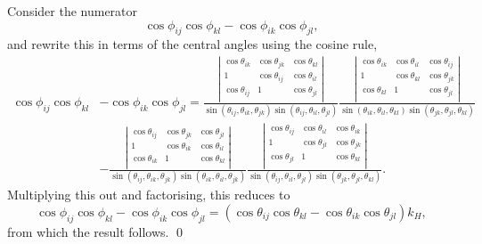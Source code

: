 \documentclass[fleqn,11pt,twoside]{article}
\makeatletter
\renewenvironment{proof}[1][\proofname]{\par
  \normalfont
  \topsep6\p@\@plus6\p@ \trivlist
  \item[\hskip\labelsep\textbf{%
    #1\@addpunct{.}}]\ignorespaces
}{%
  \qed\endtrivlist
}
\theoremstyle{definition}
\makeatother
\begin{document}
\begin{proof}
Consider the numerator
\begin{equation}
\cos\phi_{ij}\cos\phi_{kl}-\cos\phi_{ik}\cos\phi_{jl},
\end{equation}
and rewrite this in terms of the central angles using the cosine rule,
\begin{equation}
\begin{split}
\cos\phi_{ij}\cos\phi_{kl}&-\cos\phi_{ik}\cos\phi_{jl}=
\frac{\left|\begin{array}{ccc}
\cos\theta_{ik} & \cos\theta_{jk} & \cos\theta_{kl}\\
1 & \cos\theta_{ij} & \cos\theta_{il}\\
\cos\theta_{ij} & 1 & \cos\theta_{jl}\\
\end{array}\right|}
{\sin(\theta_{ij},\theta_{ik},\theta_{jk})\sin(\theta_{ij},\theta_{il},\theta_{jl})}
\frac{\left|\begin{array}{ccc}
\cos\theta_{ik} & \cos\theta_{il} & \cos\theta_{ij}\\
1 & \cos\theta_{kl} & \cos\theta_{jk}\\
\cos\theta_{kl} & 1 & \cos\theta_{jl}\\
\end{array}\right|}
{\sin(\theta_{ik},\theta_{il},\theta_{kl})\sin(\theta_{jk},\theta_{jl},\theta_{kl})}\\
&-
\frac{\left|\begin{array}{ccc}
\cos\theta_{ij} & \cos\theta_{jk} & \cos\theta_{jl}\\
1 & \cos\theta_{ik} & \cos\theta_{il}\\
\cos\theta_{ik} & 1 & \cos\theta_{kl}\\
\end{array}\right|}
{\sin(\theta_{ij},\theta_{ik},\theta_{jk})\sin(\theta_{ik},\theta_{il},\theta_{jk})}
\frac{\left|\begin{array}{ccc}
\cos\theta_{ij} & \cos\theta_{il} & \cos\theta_{ik}\\
1 & \cos\theta_{jl} & \cos\theta_{jk}\\
\cos\theta_{jl} & 1 & \cos\theta_{kl}\\
\end{array}\right|}
{\sin(\theta_{ij},\theta_{il},\theta_{jl})\sin(\theta_{jk},\theta_{jl},\theta_{kl})}.
\end{split}
\end{equation}
Multiplying this out and factorising, this reduces to
\begin{equation}
\cos\phi_{ij}\cos\phi_{kl}-\cos\phi_{ik}\cos\phi_{jl}=(\cos\theta_{ij}\cos\theta_{kl}-\cos\theta_{ik}\cos\theta_{jl})k_H,
\end{equation}
from which the result follows.
\end{proof}
\end{document}
